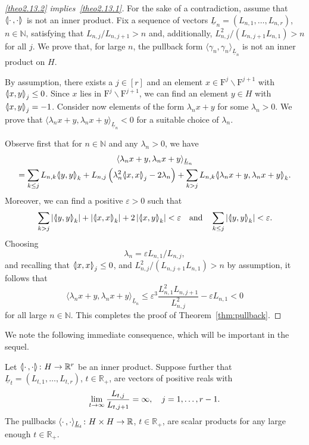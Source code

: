 \documentclass[AHL,Unicode,longabstracts]{cedram}
\newcommand{\innone}[2]{{\langle#2\rangle_{#1}}}
\newcommand{\llangle}{\mathopen{\langle\mkern -3.1mu\lvert}}
\newcommand{\rrangle}{\mathclose{\rvert\mkern -3.1mu\rangle}}
\newcommand{\highinn}[2]{{\llangle#2\rrangle_{#1}}}
\newcommand{\abss}[1]{\left\lvert #1\right\rvert}
\newcommand{\filter}{\mathrm{F}}
\newcommand{\R}{\mathbb{R}}
\newcommand{\N}{\mathbb{N}}
\renewcommand{\setminus}{\smallsetminus}
\renewcommand*{\to}{\mathchoice{\longrightarrow}{\rightarrow}{\rightarrow}{\rightarrow}}
\begin{document}
\begin{proofc}
\begin{proof}[{\eqref{theo2.13.2} implies~\eqref{theo2.13.1}}]
For the sake of a contradiction, assume that $\highinn{}{\cdot\,, \cdot}$ is not an inner product. Fix a sequence of vectors $\underline{L}_n=(L_{n,1}, \dots, L_{n,r})$, $n \in \N$, satisfying that $L_{n,j}/L_{n, j+1} > n$ and, additionally, $L_{n,j}^2 / (L_{n, j+1} L_{n, 1})> n$ for all $j$. We prove that, for large $n$, the pullback form $\innone{\underline L_n}{\gamma_n, \gamma_n}$ is not an inner product on $H$.

By assumption, there exists a $j \in [r]$ and an element $x \in \filter^j \setminus \filter^{j+1}$ with $\highinn{j}{x,y} \le 0$. Since $x$ lies in $\filter^j\setminus \filter^{j+1}$, we can find an element $y \in H$ with $\highinn{j}{x,y} = -1$. Consider now elements of the form $\lambda_n x + y$ for some $\lambda_n >0$. We prove that $\innone{\underline L_n}{\lambda_n x + y, \lambda_n x + y} < 0$ for a suitable choice of $\lambda_n$.


Observe first that for $n \in \N$ and any $\lambda_n > 0$, we have
\begin{multline*}
\innone{\underline L_n}{\lambda_n x + y, \lambda_n x + y}\\
 = \sum_{k \le j} L_{n,k}\highinn{k}{y, y} + L_{n,j}\left(\lambda_n^2 \highinn{j}{x, x} - 2\lambda_n\right) + \sum_{k > j} L_{n,k} \highinn{k}{\lambda_n x + y, \lambda_n x + y}.
\end{multline*}
Moreover, we can find a positive $\varepsilon >0$ such that
\[
\sum_{k > j} \abss{\highinn{k}{y, y}} + \abss{\highinn{k}{x, x}} + 2\abss{\highinn{k}{x, y}} < \varepsilon \quad \text{and} \quad \sum_{k \le j} \abss{\highinn{k}{y, y}}< \varepsilon.
\]
Choosing
\[
\lambda_n = \varepsilon L_{n,1}/L_{n,j},
\]
and recalling that $\highinn{j}{x, x} \le 0$, and $L_{n,j}^2 / (L_{n, j+1} L_{n, 1})> n$ by assumption, it follows that
\[
\innone{\underline L_n}{\lambda_n x + y, \lambda_n x + y} \le \varepsilon^3 \frac{L_{n,1}^2 L_{n, j+1}}{L_{n, j}^2} - \varepsilon L_{n,1} < 0
\]
for all large $n \in \N$. This completes the proof of Theorem~\ref{thm:pullback}.
\end{proof}\let\qed\relax
\end{proofc}

We note the following immediate consequence, which will be important in the sequel.


\begin{coro} \label{cor:OullbackFamiliesInnerProducts}
Let $\highinn{}{\cdot\,, \cdot} \colon H \to \R^r$ be an inner product. Suppose further that $\underline L_t = (L_{t,1}, \dots, L_{t,r})$, $t \in \R_+$, are vectors of positive reals with
\begin{equation}\label{eq:MultiScaleLimit}
\lim_{t \to \infty} \frac{L_{t,j}}{L_{t, j+1}} = \infty, \quad j=1, \dots, r-1.
\end{equation}
The pullbacks $\innone{\underline L_t}{\cdot\,, \cdot}\colon H\times H \to \R$, $t\in \R_+$, are scalar products for any large enough $t \in \R_+$.
\end{coro} 
\end{document}
